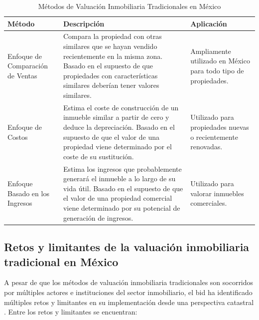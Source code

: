 \begin{table}[h]
  \centering
  \caption{Métodos de Valuación Inmobiliaria Tradicionales en México}
  \begin{tabular}{|p{4cm}|p{5cm}|p{3cm}|}
  \hline
  \rowcolor{azulclaro}
  \centering\textbf{Método} & \centering\textbf{Descripción} & \centering\textbf{Aplicación}\arraybackslash \\
  \hline
  Enfoque de Comparación de Ventas & Compara la propiedad con otras similares que se hayan vendido recientemente en la misma zona. Basado en el supuesto de que propiedades con características similares deberían tener valores similares. & Ampliamente utilizado en México para todo tipo de propiedades. \\
  \hline
  Enfoque de Costos & Estima el coste de construcción de un \gls{inmueble} similar a partir de cero y deduce la depreciación. Basado en el supuesto de que el valor de una propiedad viene determinado por el coste de su sustitución. & Utilizado para propiedades nuevas o recientemente renovadas. \\
  \hline
  Enfoque Basado en los Ingresos & Estima los ingresos que probablemente generará el \gls{inmueble} a lo largo de su vida útil. Basado en el supuesto de que el valor de una propiedad comercial viene determinado por su potencial de generación de ingresos. & Utilizado para valorar inmuebles comerciales. \\
  \hline
  \end{tabular}
  \label{tab:metodos-valuacion-tradicional}
\end{table}

\subsection{Retos y limitantes de la valuación inmobiliaria tradicional en México}
A pesar de que los métodos de valuación inmobiliaria tradicionales son socorridos
por múltiples actores e instituciones del sector inmobiliario, el \acrfull{bid}
ha identificado múltiples retos y limitantes en su implementación desde una
perspectiva catastral \cite{eguino2020catastro}. Entre los retos y limitantes
se encuentran:

